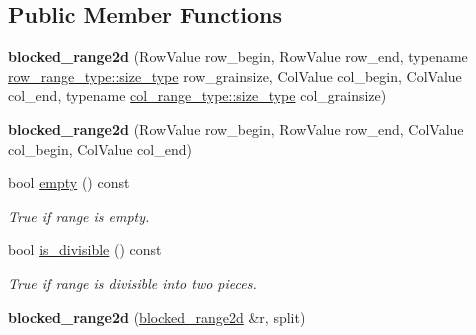 \subsection*{Public Member Functions}
\begin{DoxyCompactItemize}
\item 
\hypertarget{classtbb_1_1blocked__range2d_a5aa4e2c389c4b833937fcad66efe2b6a}{}{\bfseries blocked\+\_\+range2d} (Row\+Value row\+\_\+begin, Row\+Value row\+\_\+end, typename \hyperlink{classtbb_1_1blocked__range_a89b300cecd9d617e4ee801c786756e55}{row\+\_\+range\+\_\+type\+::size\+\_\+type} row\+\_\+grainsize, Col\+Value col\+\_\+begin, Col\+Value col\+\_\+end, typename \hyperlink{classtbb_1_1blocked__range_a89b300cecd9d617e4ee801c786756e55}{col\+\_\+range\+\_\+type\+::size\+\_\+type} col\+\_\+grainsize)\label{classtbb_1_1blocked__range2d_a5aa4e2c389c4b833937fcad66efe2b6a}

\item 
\hypertarget{classtbb_1_1blocked__range2d_aaf45f93921022437fdcb500585768a5e}{}{\bfseries blocked\+\_\+range2d} (Row\+Value row\+\_\+begin, Row\+Value row\+\_\+end, Col\+Value col\+\_\+begin, Col\+Value col\+\_\+end)\label{classtbb_1_1blocked__range2d_aaf45f93921022437fdcb500585768a5e}

\item 
\hypertarget{classtbb_1_1blocked__range2d_a5805972c8c41b2681d286f9c9771cf52}{}bool \hyperlink{classtbb_1_1blocked__range2d_a5805972c8c41b2681d286f9c9771cf52}{empty} () const \label{classtbb_1_1blocked__range2d_a5805972c8c41b2681d286f9c9771cf52}

\begin{DoxyCompactList}\small\item\em True if range is empty. \end{DoxyCompactList}\item 
\hypertarget{classtbb_1_1blocked__range2d_ac84c6cc2ff8b0974ffa719fed804f586}{}bool \hyperlink{classtbb_1_1blocked__range2d_ac84c6cc2ff8b0974ffa719fed804f586}{is\+\_\+divisible} () const \label{classtbb_1_1blocked__range2d_ac84c6cc2ff8b0974ffa719fed804f586}

\begin{DoxyCompactList}\small\item\em True if range is divisible into two pieces. \end{DoxyCompactList}\item 
\hypertarget{classtbb_1_1blocked__range2d_af0e752d01b661b01c9a473473bea43fc}{}{\bfseries blocked\+\_\+range2d} (\hyperlink{classtbb_1_1blocked__range2d}{blocked\+\_\+range2d} \&r, split)\label{classtbb_1_1blocked__range2d_af0e752d01b661b01c9a473473bea43fc}


\end{DoxyCompactItemize}
